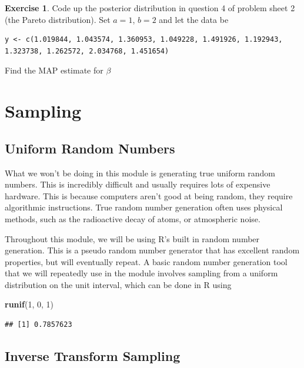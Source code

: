 \documentclass[
]{book}
\newenvironment{Shaded}{\begin{snugshade}}{\end{snugshade}}
\newcommand{\DecValTok}[1]{\textcolor[rgb]{0.00,0.00,0.81}{#1}}
\newcommand{\FunctionTok}[1]{\textcolor[rgb]{0.13,0.29,0.53}{\textbf{#1}}}
\newcommand{\NormalTok}[1]{#1}
\theoremstyle{definition}
\theoremstyle{definition}
\theoremstyle{definition}
\newtheorem{exercise}{Exercise}[chapter]
\theoremstyle{definition}
\theoremstyle{remark}
\begin{document}
\begin{exercise}
Code up the posterior distribution in question 4 of problem sheet 2 (the Pareto distribution). Set \(a = 1\), \(b = 2\) and let the data be

\begin{verbatim}
y <- c(1.019844, 1.043574, 1.360953, 1.049228, 1.491926, 1.192943, 1.323738, 1.262572, 2.034768, 1.451654)
\end{verbatim}

Find the MAP estimate for \(\beta\)
\end{exercise}

\hypertarget{sampling}{%
\chapter{Sampling}\label{sampling}}

\hypertarget{uniform-random-numbers}{%
\section{Uniform Random Numbers}\label{uniform-random-numbers}}

What we won't be doing in this module is generating true uniform random numbers. This is incredibly difficult and usually requires lots of expensive hardware. This is because computers aren't good at being random, they require algorithmic instructions. True random number generation often uses physical methods, such as the radioactive decay of atoms, or atmospheric noise.

Throughout this module, we will be using R's built in random number generation. This is a pseudo random number generator that has excellent random properties, but will eventually repeat. A basic random number generation tool that we will repeatedly use in the module involves sampling from a uniform distribution on the unit interval, which can be done in R using

\begin{Shaded}
\begin{Highlighting}[]
\FunctionTok{runif}\NormalTok{(}\DecValTok{1}\NormalTok{, }\DecValTok{0}\NormalTok{, }\DecValTok{1}\NormalTok{)}
\end{Highlighting}
\end{Shaded}

\begin{verbatim}
## [1] 0.7857623
\end{verbatim}

\hypertarget{inverse-transform-sampling}{%
\section{Inverse Transform Sampling}\label{inverse-transform-sampling}}
\end{document}
